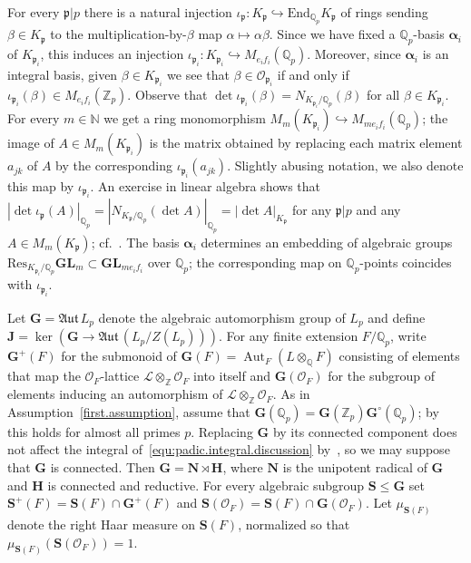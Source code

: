 \documentclass[11pt,a4paper]{amsart}
\theoremstyle{plain}
\theoremstyle{remark}
\newcommand{\N}{\mathbb{N}}
\newcommand{\Z}{\mathbb{Z}}
\newcommand{\Q}{\mathbb{Q}}
\newcommand{\tensor}{\otimes}
\newcommand{\p}{\mathfrak{p}}
\DeclareMathOperator{\Aut}{Aut}
\def \aAut {\mathfrak{Aut} \,}
\def \p {\ensuremath{\mathfrak{p}}}
\begin{document}
For every $\p | p$ there is a natural injection $\iota_\p: K_{\p} \hookrightarrow \mathrm{End}_{\Q_p} K_{\p}$ of rings sending $\beta \in K_{\p}$ to the multiplication-by-$\beta$ map $\alpha \mapsto \alpha \beta$.  Since we have fixed a $\Q_p$-basis $\boldsymbol{\alpha}_i$ of $K_{\p_i}$, this induces an injection $\iota_{\p_i} : K_{\p_i} \hookrightarrow M_{e_i f_i}(\Q_p)$.  Moreover, since $\boldsymbol{\alpha}_i$ is an integral basis, given $\beta \in K_{\p_i}$ we see that $\beta \in \mathcal{O}_{\p_i}$ if and only if $\iota_{\p_i}(\beta) \in M_{e_i f_i}(\Z_p)$.  Observe that $\det \iota_{\p_i}(\beta) = N_{K_{\p_i}/\Q_p}(\beta)$ for all $\beta \in K_{\p_i}$.  For every $m \in \N$ we get a ring monomorphism $M_m(K_{\p_i}) \hookrightarrow M_{me_if_i}(\Q_p)$; the image of $A \in M_m(K_{\p_i})$ is the matrix obtained by replacing each matrix element $a_{jk}$ of $A$ by the corresponding $\iota_{\p_i} (a_{jk})$.  Slightly abusing notation, we also denote this map by $\iota_{\p_i}$.  An exercise in linear algebra shows that $| \det \iota_\p (A) |_{\Q_p} = | N_{K_{\p} / \Q_p} (\det A) |_{\Q_p} = | \det A |_{{K_\p}}$ for any $\p | p$ and any $A \in M_m(K_{\p})$; cf.~\cite[Theorem~1]{KSW/99}.  The basis $\boldsymbol{\alpha}_i$ determines an embedding of algebraic groups $\mathrm{Res}_{K_{\p_i}/ \Q_p} \mathbf{GL}_m \subset \mathbf{GL}_{me_if_i}$ over $\Q_p$; the corresponding map on $\Q_p$-points coincides with $\iota_{\p_i}$.

Let $\mathbf{G} = \aAut {L}_p$ denote the algebraic automorphism group of ${L}_p$ and define $\mathbf{J} = \ker(\mathbf{G} \to \aAut (L_p/Z(L_p)))$.  For any finite extension $F / \Q_p$, write $\mathbf{G}^+(F)$ for the submonoid of $\mathbf{G}(F) = \Aut_F (L \tensor_\Q F)$ consisting of elements that map the $\mathcal{O}_F$-lattice $\mathcal{L} \tensor_\Z \mathcal{O}_F$ into itself and $\mathbf{G}(\mathcal{O}_F)$ for the subgroup of elements inducing an automorphism of $\mathcal{L} \tensor_\Z \mathcal{O}_F$.  As in Assumption~\ref{first.assumption}, assume that $\mathbf{G}(\Q_p) = \mathbf{G}(\Z_p) \mathbf{G}^\circ (\Q_p)$; by~\cite[Lemma~4.1]{duSLubotzky/96} this holds for almost all primes $p$.  Replacing $\mathbf{G}$ by its connected component does not affect the integral of~\eqref{equ:padic.integral.discussion} by~\cite[Proposition~2.1]{duSLubotzky/96}, so we may suppose that $\mathbf{G}$ is connected.  Then $\mathbf{G} = \mathbf{N} \rtimes \mathbf{H}$, where $\mathbf{N}$ is the unipotent radical of $\mathbf{G}$ and $\mathbf{H}$ is connected and reductive.
For every algebraic subgroup $\mathbf{S} \leq \mathbf{G}$ set $\mathbf{S}^+(F) = \mathbf{S}(F) \cap \mathbf{G}^+(F)$ and $\mathbf{S}(\mathcal{O}_F) = \mathbf{S}(F) \cap \mathbf{G}(\mathcal{O}_F)$.  Let $\mu_{\mathbf{S}(F)}$ denote the right Haar measure on $\mathbf{S}(F)$, normalized so that $\mu_{\mathbf{S}(F)}(\mathbf{S}(\mathcal{O}_F)) = 1$.
\end{document}
